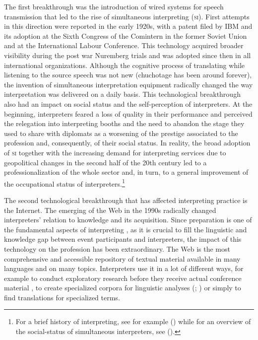 \documentclass[output=paper]{langsci/langscibook}
\begin{document}
The first breakthrough was the introduction of wired systems for speech transmission that led to the rise of simultaneous interpreting (\textsc{si}). First attempts in this direction were reported in the early 1920s, with a patent filed by IBM and its adoption at the Sixth Congress of the Comintern in the former Soviet Union and at the International Labour Conference. This technology acquired broader visibility during the post war Nuremberg trials and was adopted since then in all international organizations. Although the cognitive process of translating while listening to the source speech was not new (chuchotage has been around forever), the invention of simultaneous interpretation equipment radically changed the way interpretation was delivered on a daily basis. This technological breakthrough also had an impact on social status and the self-perception of interpreters. At the beginning, interpreters feared a loss of quality in their performance and perceived the relegation into interpreting booths and the need to abandon the stage they used to share with diplomats as a worsening of the prestige associated to the profession and, consequently, of their social status. In reality, the broad adoption of \textsc{si} together with the increasing demand for interpreting services due to geopolitical changes in the second half of the 20th century led to a professionalization of the whole sector and, in turn, to a general improvement of the occupational status of interpreters.\footnote{For a brief history of interpreting, see for example \citeauthor{takeda_new_2016} (\citeyear{takeda_new_2016}) while for an overview of the social-status of simultaneous interpreters, see \citeauthor{Gentile2013} (\citeyear{Gentile2013}).} 
 
The second technological breakthrough that has affected interpreting practice is the Internet. The emerging of the Web in the 1990s radically changed interpreters’ relation to knowledge and its acquisition. Since preparation is one of the fundamental aspects of interpreting \citep{Gile2009}, as it is crucial to fill the linguistic and knowledge gap between event participants and interpreters, the impact of this technology on the profession has been extraordinary. The Web is the most comprehensive and accessible repository of textual material available in many languages and on many topics. Interpreters use it in a lot of different ways, for example to conduct exploratory research before they receive actual conference material \citep{chang_conference_2018}, to create specialized corpora for linguistic analyses (\citealt{Fantinuoli2017a,Fantinuoli2018c}; \citealt{xu_corpus-based_2018}) or simply to find translations for specialized terms. 
\end{document}
